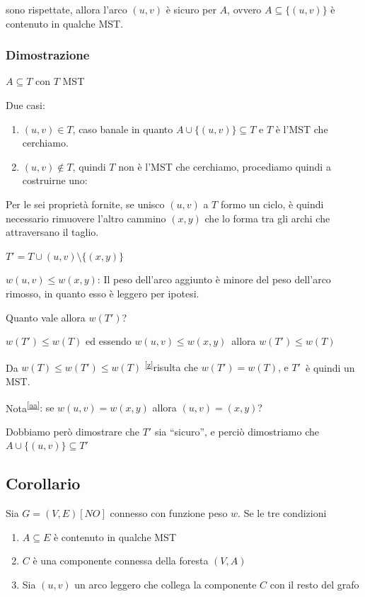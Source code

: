 \documentclass[11pt,a4paper,twoside,openright]{book}
\providecommand{\tightlist}{\setlength{\itemsep}{0pt}\setlength{\parskip}{0pt}}
\begin{document}
{{{sono rispettate, allora l'arco $(u,v)$ è sicuro per $A$, ovvero $A \subseteq \{(u,v)\}$ è contenuto in qualche MST.}

\subsubsection{Dimostrazione}

{$A \subseteq T$ con $T$ MST}

{Due casi:}

\begin{enumerate}
\tightlist
\item
  {$(u,v) \in T$, caso banale in quanto $A \cup \{(u,v)\} \subseteq T$  e $T$ è l'MST che cerchiamo.}
\item
  {$(u,v) \notin T$, quindi $T$ non è l'MST che cerchiamo, procediamo quindi a costruirne uno:}
\end{enumerate}

{Per le sei proprietà fornite, se unisco $(u,v)$ a $T$ formo un ciclo, è quindi necessario rimuovere l'altro cammino $(x,y)$ che lo forma tra gli archi che attraversano il taglio. }

$T' = T \cup {(u,v)} \setminus \{(x,y)\} $



$w(u,v) \leq w(x,y)${: Il peso dell'arco aggiunto è minore del peso dell'arco rimosso, in quanto esso è leggero per ipotesi.}

{Quanto vale allora $w(T')$? }

$w(T') \leq w(T)$ {ed essendo }$w(u,v) \leq w(x,y)${~allora $w(T') \leq w(T)$}

{Da }$w(T) \leq w(T') \leq w(T)$ \textsuperscript{\protect\hyperlink{cmnt26}{{[}z{]}}}{risulta che $w(T') = w(T)$, e }$T'${~è quindi un MST.}

{Nota}\textsuperscript{\protect\hyperlink{cmnt27}{{[}aa{]}}}{: se $w(u,v) = w(x,y)$ allora $(u,v) = (x,y)$?}

{Dobbiamo però dimostrare che $T'$ sia ``sicuro'', e perciò dimostriamo che \\ $A \cup \{(u,v)\} \subseteq T'$}

\subsection{Corollario}

{Sia $G=(V,E) [NO]$ connesso con funzione peso $w$. Se le tre condizioni}

\begin{enumerate}
\tightlist
\item
  {$A \subseteq E$ è contenuto in qualche MST}
\item
  {$C$ è una componente connessa della foresta $(V,A)$}
\item
  {Sia $(u,v)$ un arco leggero che collega la componente $C$ con il resto del grafo}
\end{enumerate}

}}
\end{document}

